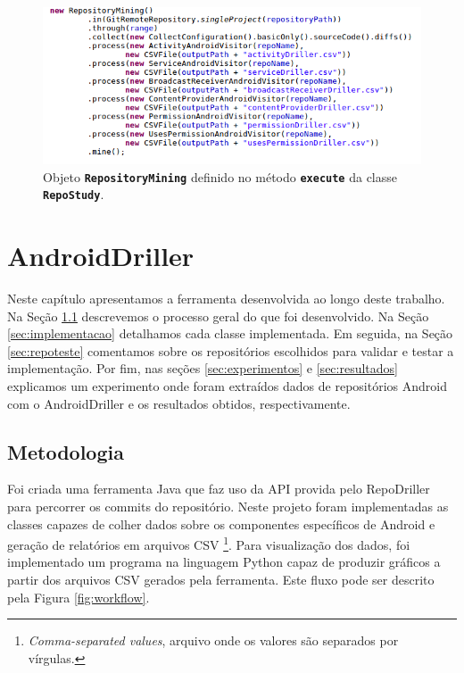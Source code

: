 \documentclass[a4paper,12pt]{article}
\begin{document}
\begin{figure}[h]
\centering
\includegraphics[width=\linewidth]{imgs/repostudy.png}
\caption{Objeto {\small\texttt{\textbf{RepositoryMining}}} definido no método {\small\texttt{\textbf{execute}}} da classe {\small\texttt{\textbf{RepoStudy}}}.}
\label{fig:repostudy}
\end{figure}



\newpage
\section{AndroidDriller}%

Neste capítulo apresentamos a ferramenta desenvolvida ao longo deste trabalho. Na Seção \ref{sec:metodologia} descrevemos o processo geral do que foi desenvolvido. Na Seção \ref{sec:implementacao} detalhamos cada classe implementada. Em seguida, na Seção \ref{sec:repoteste} comentamos sobre os repositórios escolhidos para validar e testar a implementação. Por fim, nas seções \ref{sec:experimentos} e \ref{sec:resultados} explicamos um experimento onde foram extraídos dados de repositórios Android com o AndroidDriller  e os resultados obtidos, respectivamente.

\subsection{Metodologia}
\label{sec:metodologia}
Foi criada uma ferramenta Java que faz uso da API provida pelo RepoDriller para percorrer os commits do repositório. Neste projeto foram implementadas as classes capazes de colher dados sobre os componentes específicos de Android e geração de relatórios em arquivos CSV \footnote{\textit{Comma-separated values}, arquivo onde os valores são separados por vírgulas.}. Para visualização dos dados, foi implementado um programa na linguagem Python \cite{python} capaz de produzir gráficos a partir dos arquivos CSV gerados pela ferramenta. Este fluxo pode ser descrito pela Figura \ref{fig:workflow}. 
\end{document}
